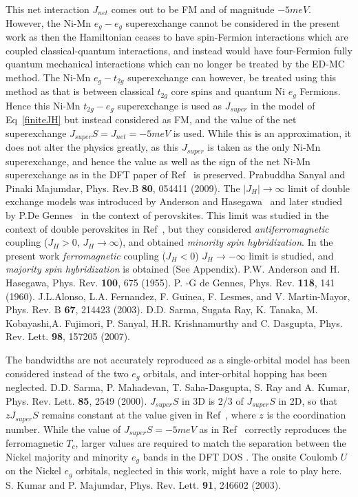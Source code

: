 \documentclass[english,aps,prb,twocolumn,showpacs]{revtex4-1}
\begin{document}
\begin{thebibliography}{99}
 This net interaction $J_{net}$ comes out to be FM and of magnitude $-5meV$. 
 However, the Ni-Mn $e_{g}-e_{g}$ superexchange cannot be considered in the present work as then the 
 Hamiltonian ceases to have spin-Fermion interactions which are coupled classical-quantum interactions, 
  and instead would have four-Fermion fully quantum mechanical interactions
  which can no longer be treated by the ED-MC
 method. The Ni-Mn $e_{g}-t_{2g}$
 superexchange can however, be treated using this method as that is between classical $t_{2g}$ core spins and quantum
 Ni $e_{g}$ Fermions. Hence this Ni-Mn $t_{2g}-e_{g}$ superexchange is used as $J_{super}$
 in the model of Eq~\ref{finiteJH} but instead considered 
 as FM, and the value of the net superexchange $J_{super}S=J_{net}=-5meV$ is used. While this is an
 approximation, it does not alter the physics greatly, as this $J_{super}$ is taken as the only Ni-Mn superexchange,
 and hence the value as well as the sign of the net Ni-Mn superexchange 
 as in the DFT paper of Ref~\cite{Tanusri} is preserved.
 Prabuddha Sanyal and Pinaki Majumdar, Phys. Rev.B {\bf 80}, 054411 (2009).
 The $|J_{H}|\rightarrow\infty$ limit of double exchange models was introduced by
 Anderson and Hasegawa~\cite{AndHas} and later studied by P.De Gennes~\cite{DeGennes} in the context
 of perovskites. This limit was studied in the context of double perovskites in Ref~\cite{FGuinea}, but they
 considered {\em antiferromagnetic} coupling ($J_{H}>0$, $J_{H}\rightarrow\infty$), 
 and obtained {\em minority spin hybridization}. 
In the present work  {\em ferromagnetic} coupling ($J_{H}<0$) $J_{H}\rightarrow -\infty$ limit is studied, 
and {\em majority spin hybridization} is obtained (See Appendix). 
 P.W. Anderson and H. Hasegawa, Phys. Rev. {\bf 100}, 675 (1955).
 P. -G de Gennes, Phys. Rev. {\bf 118}, 141 (1960).
 J.L.Alonso, L.A. Fernandez, F. Guinea, F. Lesmes, and V. Martin-Mayor, Phys. Rev. B {\bf 67}, 214423 (2003).
 D.D. Sarma, Sugata Ray, K. Tanaka, M. Kobayashi,A. Fujimori, P. Sanyal, H.R. Krishnamurthy and C. Dasgupta,
Phys. Rev. Lett. {\bf 98}, 157205 (2007). 

 The bandwidths are not accurately reproduced as a single-orbital model has been considered instead
 of the two $e_{g}$ orbitals, and inter-orbital hopping has been neglected.
 D.D. Sarma, P. Mahadevan, T. Saha-Dasgupta, S. Ray and A. Kumar, Phys. Rev. Lett. {\bf 85}, 2549
 (2000).
 $J_{super}S$ in 3D is 2/3 of $J_{super}S$ in 2D, so that $zJ_{super}S$ remains constant at the
 value given in Ref~\cite{Tanusri}, where $z$ is the 
 coordination number. 
 While the value of $J_{super}S=-5 meV$ as in
 Ref~\cite{Tanusri} correctly reproduces the ferromagnetic $T_{c}$, larger values are required to match the separation
 between the Nickel majority and minority $e_{g}$ bands in the DFT DOS . 
 The onsite Coulomb $U$ on the Nickel $e_{g}$ orbitals, neglected in this work, might have a role to play here.
 S. Kumar and P. Majumdar, Phys. Rev. Lett. {\bf 91}, 246602 (2003).
 

\end{thebibliography}
\end{document}
